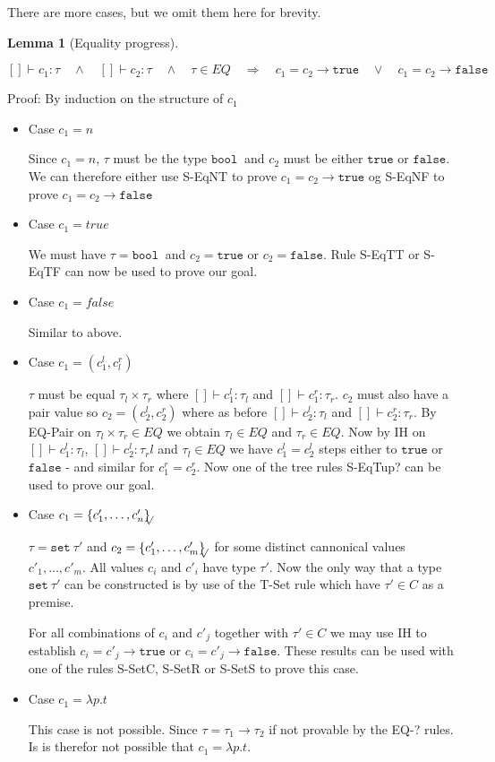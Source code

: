 \documentclass[a4paper]{article}
\newcommand{\s}[1]{\mathtt{#1}}
\newcommand{\sLb}{\s{\{}}
\newcommand{\sRb}{\s{\}}}
\newcommand{\sbool}{\s{bool\ }}
\newcommand{\sseta}{\s{set\ }}
\newcommand{\strue}{\s{true}}
\newcommand{\sfalse}{\s{false}}
\newcommand{\sset}[1]{\sLb #1 \sRb}
\newcommand{\ssetc}[1]{\sset{#1}_{\!\!\!\surd}}
\newcommand{\im}{\Rightarrow}
\newcommand{\step}{\to}
\newtheorem{lemma}{Lemma}[section]
\begin{document}
There are more cases, but
we omit them
here for brevity.




\begin{lemma}[Equality progress] $ $
  \label{lemma:equalityProgress}

$[]\vdash c_1:\tau \quad \land \quad []\vdash c_2:\tau \quad \land \quad \tau \in EQ \quad \im \quad
c_1 = c_2 \step \strue \quad \lor \quad c_1 = c_2 \step \sfalse$
\end{lemma}

Proof: By induction on the structure of $c_1$
\begin{itemize}
\item Case $c_1 = n$

Since $c_1 = n$, $\tau$ must be the type $\sbool$ and $c_2$ must be either $\strue$ or $\sfalse$. We can therefore either use S-EqNT to prove $c_1 = c_2 \step \strue$ og S-EqNF to prove $c_1 = c_2 \step \sfalse$

\item Case $c_1 = true$

We must have $\tau = \sbool$ and $c_2 = \strue$ or $c_2 = \sfalse$. Rule S-EqTT or S-EqTF can now be used to prove our goal.

\item Case $c_1 = false$

Similar to above.

\item Case $c_1 = (c_1^l, c_l^r)$

$\tau$ must be equal $\tau_l \times \tau_r$ where $[]\vdash c_1^l:\tau_l$ and $[]\vdash c_1^r:\tau_r$. $c_2$ must also have a pair value so $c_2 = (c_2^l, c_2^r)$ where as before $[]\vdash c_2^l:\tau_l$ and $[]\vdash c_2^r:\tau_r$. By EQ-Pair on $\tau_l \times \tau_r \in EQ$ we obtain $\tau_l \in EQ$ and $\tau_r \in EQ$. Now by IH on $[]\vdash c_1^l:\tau_l$, $[]\vdash c_2^l:\tau_rl$ and $\tau_l \in EQ$ we have $c_1^l = c_2^l$ steps either to $\strue$ or $\sfalse$ - and similar for $c_1^r = c_2^r$. Now one of the tree rules S-EqTup? can be used to prove our goal.

\item Case $c_1 = \ssetc{c'_1,\ldots,c'_n}$

$\tau = \sseta \tau'$ and $c_2 = \ssetc{c'_1,\ldots,c'_m}$ for some distinct cannonical values $c'_1,\ldots,c'_m$. All values $c_i$ and $c'_i$ have type $\tau'$. Now the only way that a type $\sseta \tau'$ can be constructed is by use of the T-Set rule which have $\tau' \in C$ as a premise.

For all combinations of $c_i$ and $c'_j$ together with $\tau' \in C$ we may use IH to establish $c_i = c'_j \step \strue$ or $c_i = c'_j \step \sfalse$. These results can be used with one of the rules S-SetC, S-SetR or S-SetS to prove this case.

\item Case $c_1 = \lambda p.t$

This case is not possible. Since $\tau = \tau_1 \to \tau_2$ if not provable by the EQ-? rules. Is is therefor not possible that $c_1 = \lambda p.t$.
\end{itemize}
\end{document}
